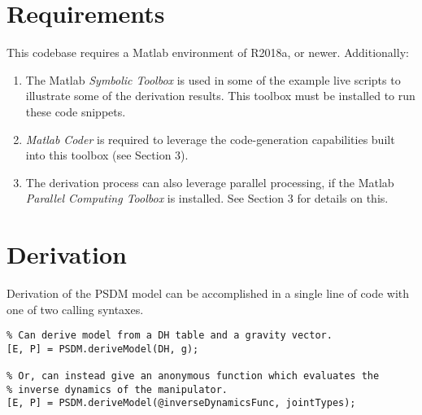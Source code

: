 \documentclass[12pt]{article}
\begin{document}
\section{Requirements}
This codebase requires a Matlab environment of R2018a, or newer. Additionally:
\begin{enumerate}[nosep]
\item The Matlab \textit{Symbolic Toolbox} is used in some of the example live scripts to illustrate some of the derivation results. This toolbox must be installed to run these code snippets.
\item \textit{Matlab Coder} is required to leverage the code-generation capabilities built into this toolbox (see Section 3).
\item The derivation process can also leverage parallel processing, if the Matlab \textit{Parallel Computing Toolbox} is installed. See Section 3 for details on this. 
\end{enumerate}

\section{Derivation}

Derivation of the PSDM model can be accomplished in a single line of code with one of two calling syntaxes. 

\begin{lstlisting}
% Can derive model from a DH table and a gravity vector.
[E, P] = PSDM.deriveModel(DH, g);

% Or, can instead give an anonymous function which evaluates the 
% inverse dynamics of the manipulator.
[E, P] = PSDM.deriveModel(@inverseDynamicsFunc, jointTypes);
\end{lstlisting}
\end{document}
